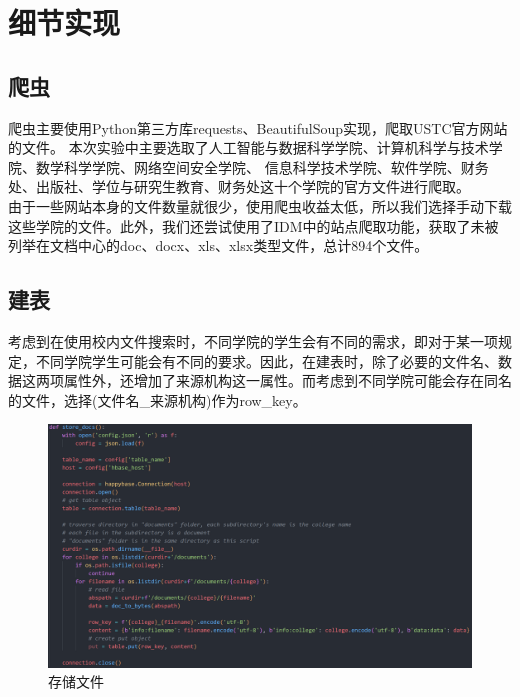 \documentclass{article}
\begin{document}
	\section{细节实现}
	\subsection{爬虫}
	爬虫主要使用Python第三方库requests、BeautifulSoup实现，爬取USTC官方网站的文件。
	本次实验中主要选取了人工智能与数据科学学院、计算机科学与技术学院、数学科学学院、网络空间安全学院、
	信息科学技术学院、软件学院、财务处、出版社、学位与研究生教育、财务处这十个学院的官方文件进行爬取。
	\\
	\indent 由于一些网站本身的文件数量就很少，使用爬虫收益太低，所以我们选择手动下载这些学院的文件。此外，我们还尝试使用了IDM中的站点爬取功能，获取了未被列举在文档中心的doc、docx、xls、xlsx类型文件，总计894个文件。
\newpage
	\subsection{建表}
	考虑到在使用校内文件搜索时，不同学院的学生会有不同的需求，即对于某一项规定，不同学院学生可能会有不同的要求。因此，在建表时，除了必要的文件名、数据这两项属性外，还增加了来源机构这一属性。而考虑到不同学院可能会存在同名的文件，选择(文件名\_来源机构)作为row\_key。
	\begin{figure}[h]
		\centering
		\includegraphics[width=0.6\linewidth]{store}
		\caption{存储文件}
		\label{fig:store}
	\end{figure}
\end{document}
